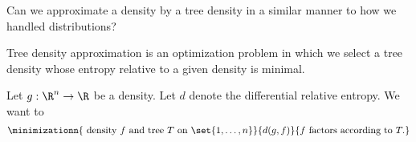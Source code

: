 
Can we approximate a density by a tree density in a similar manner to how we handled distributions?


Tree density approximation is an optimization problem in which we select a tree density whose entropy relative to a given density is minimal.


Let $g: \R^n \to \R$ be a density.
Let $d$ denote the differential
relative entropy.
We want to
\[
  \minimizationn{
    \text{ density } f \text{ and tree } T \text{ on } \set{1, \dots, n}
  }{
    d(g, f)
  }{
    f \text{ factors according to } T.
  }
\]
\strats
